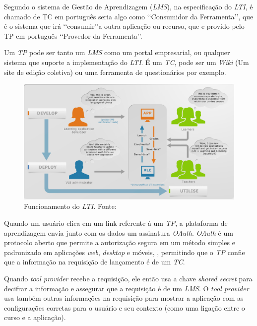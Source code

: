 Segundo  o sistema de Gestão de Aprendizagem (\textit{LMS}), na especificação do \textit{LTI}, é chamado de \ac{TC} em português seria algo como \lq\lq Consumidor da Ferramenta\rq\rq, que é o sistema que irá \lq\lq consumir\rq\rq a outra aplicação ou recurso, que e provido pelo \ac{TP} em português \lq\lq Provedor da Ferramenta\rq\rq.

Um \textit{TP} pode ser tanto um \textit{LMS} como um portal empresarial, ou qualquer sistema que suporte a implementação do \textit{LTI}. É um \textit{TC}, pode ser um \textit{Wiki} (Um site de edição coletiva) ou uma ferramenta de questionários por exemplo.
\begin{figure}[h]
    \centering
    \label{fig:ims-lti-funcionamento}
    \includegraphics[keepaspectratio=true,scale=0.5]{figuras/ims-lti-funcionamento.png}
    \caption{Funcionamento do \textit{LTI}. Fonte: }
\end{figure}

Quando um usuário clica em um link referente à um \textit{TP}, a plataforma de aprendizagem envia junto com os dados um assinatura \textit{OAuth}. \textit{OAuth} é um protocolo aberto que permite a autorização segura em um método simples e padronizado em aplicações \textit{web}, \textit{desktop} e móveis, \cite{oauth}, permitindo que o \textit{TP} confie que a informação na requisição de lançamento é de um \textit{TC}.

Quando \textit{tool provider} recebe a requisição, ele então usa a chave \textit{shared secret} para decifrar a informação e assegurar que a requisição é de um \textit{LMS}. O \textit{tool provider} usa também outras informações na requisição para mostrar a aplicação com as configurações corretas para o usuário e seu contexto (como uma ligação entre o curso e a aplicação).

